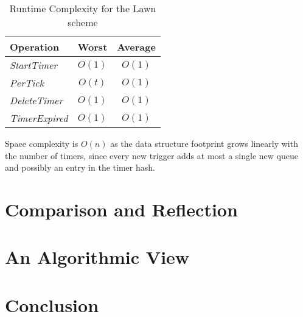 \documentclass[twocolumn,a4paper]{article}
\newcommand{\advcomplexity}[9]{
\begin{table}[h!]
	\begin{center}
		\begin{tabular}{l|c|c}
			\textbf{Operation} & \textbf{Worst} & \textbf{Average} \\
			\hline
			\textit{StartTimer} & $O(#1)$ & $O(#2)$ \\
			\textit{PerTick} & $O(#3)$ & $O(#4)$ \\
			\textit{DeleteTimer} & $O(#5)$ & $O(#6)$ \\
			\textit{TimerExpired} & $O(#7)$ & $O(#8)$ \\
		\end{tabular}
		\caption{Runtime Complexity for #9 scheme}
		\label{tab:table1}
	\end{center}
\end{table}
}
\begin{document}
\advcomplexity{1}{1}{t}{1}{1}{1}{1}{1}{the Lawn}

Space complexity is $O(n)$ as the data structure footprint grows linearly with the number of timers, since every new trigger adds at most a single new queue and possibly an entry in the timer hash.

\section{Comparison and Reflection}

\section{An Algorithmic View}

\section{Conclusion}



\end{document}

